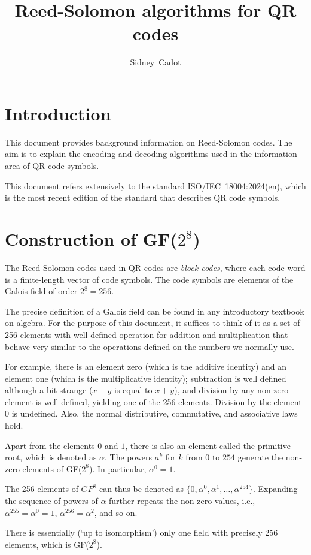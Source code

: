 \documentclass[a4paper]{article}
\title{Reed-Solomon algorithms for QR codes}
\author{Sidney~Cadot}
\begin{document}
\maketitle
\section{Introduction}
%
This document provides background information on Reed-Solomon codes.
The aim is to explain the encoding and decoding algorithms used in the information area of QR code symbols.

This document refers extensively to the standard ISO/IEC~18004:2024(en), which is the
most recent edition of the standard that describes QR code symbols.
%
\section{Construction of GF($2^8$)}
The Reed-Solomon codes used in QR codes are \emph{block codes}, where each code word is a
finite-length vector of code symbols. The code symbols are elements of the Galois field of
order $2^8=256$.

The precise definition of a Galois field can be found in any introductory textbook
on algebra. For the purpose of this document, it suffices to think of it as a set of
256 elements with well-defined operation for addition and multiplication that behave
very similar to the operations defined on the numbers we normally use.

For example, there is an element zero (which is the additive identity) and an element
one (which is the multiplicative identity); subtraction is well defined although a bit
strange ($x-y$ is equal to $x+y$), and division by any non-zero element is well-defined,
yielding one of the 256 elements. Division by the element 0 is undefined.
Also, the normal distributive, commutative, and associative laws hold.

Apart from the elements $0$ and $1$, there is also an element called the primitive root,
which is denoted as $\alpha$. The powers $a^k$ for $k$ from $0$ to $254$ generate the
non-zero elements of GF($2^8$). In particular, $\alpha^0=1$.

The 256 elements of $GF^8$ can thus be denoted as $\{ 0, \alpha^0, \alpha^1, \ldots, \alpha^{254} \}$.
Expanding the sequence of powers of $\alpha$ further repeats the non-zero values, i.e., $\alpha^{255}=\alpha^0=1$, $\alpha^{256}=\alpha^2$, and so on.

There is essentially (`up to isomorphism') only one field with precisely 256 elements, which is GF($2^8$).
\end{document}
